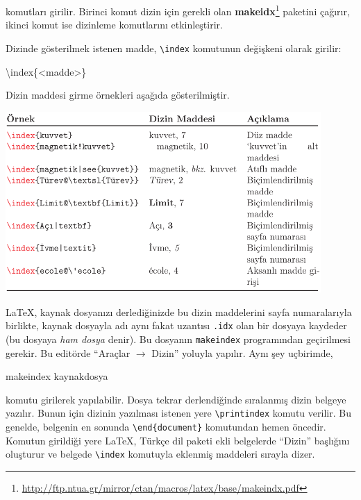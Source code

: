 \documentclass[
  10pt,
]{scrbook}
\newenvironment{Shaded}{\begin{snugshade}}{\end{snugshade}}
\newcommand{\ExtensionTok}[1]{#1}
\newcommand{\FunctionTok}[1]{\textcolor[rgb]{0.00,0.00,0.00}{#1}}
\newcommand{\NormalTok}[1]{#1}
\renewcommand{\href}[2]{#2\footnote{\url{#1}}}
\theoremstyle{definition}
\theoremstyle{definition}
\theoremstyle{definition}
\theoremstyle{definition}
\theoremstyle{remark}
\begin{document}
komutları girilir. Birinci komut dizin için gerekli olan \href{http://ftp.ntua.gr/mirror/ctan/macros/latex/base/makeindx.pdf}{\textbf{makeidx}} paketini çağırır, ikinci komut ise dizinleme komutlarını etkinleştirir.

Dizinde gösterilmek istenen madde, \texttt{\textbackslash{}index} komutunun değişkeni olarak girilir:

\begin{Shaded}
\begin{Highlighting}[]
\FunctionTok{\textbackslash{}index}\NormalTok{\{\textless{}madde\textgreater{}\}}
\end{Highlighting}
\end{Shaded}

Dizin maddesi girme örnekleri aşağıda gösterilmiştir.

\includegraphics[width=0.9\textwidth,height=\textheight]{images/dizina.png}

LaTeX, kaynak dosyanızı derlediğinizde bu dizin maddelerini sayfa numaralarıyla birlikte, kaynak dosyayla adı aynı fakat uzantısı \texttt{.idx} olan bir dosyaya kaydeder (bu dosyaya \emph{ham dosya} denir). Bu dosyanın \texttt{makeindex} programından geçirilmesi gerekir. Bu editörde ``Araçlar \(\rightarrow\) Dizin'' yoluyla yapılır. Aynı şey uçbirimde,

\begin{Shaded}
\begin{Highlighting}[]
\ExtensionTok{makeindex}\NormalTok{ kaynakdosya}
\end{Highlighting}
\end{Shaded}

komutu girilerek yapılabilir. Dosya tekrar derlendiğinde sıralanmış dizin belgeye yazılır. Bunun için dizinin yazılması istenen yere \texttt{\textbackslash{}printindex} komutu verilir. Bu genelde, belgenin en sonunda \texttt{\textbackslash{}end\{document\}} komutundan hemen öncedir. Komutun girildiği yere LaTeX, Türkçe dil paketi ekli belgelerde ``Dizin'' başlığını oluşturur ve belgede \texttt{\textbackslash{}index} komutuyla eklenmiş maddeleri sırayla dizer.
\end{document}
